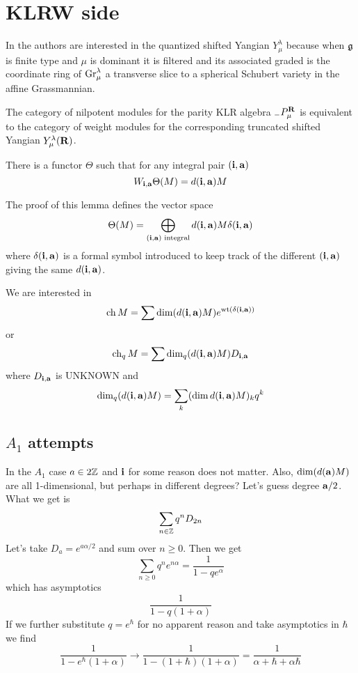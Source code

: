 
\section{KLRW side}


% 
In \cite{kam19} the authors are interested in the quantized shifted Yangian $Y^\lambda_\mu$ because when $\mathfrak g$ is finite type and $\mu$ is dominant it is filtered and its associated graded is the coordinate ring of $\operatorname{Gr}^\lambda_\mu$ a transverse slice to a spherical Schubert variety in the affine Grassmannian. 
%
\begin{theorem}\cite{kam19}
    The category of nilpotent modules for the parity KLR algebra ${}_-P_\mu^{{\bf R}}$ is equivalent to the category of weight modules for the corresponding truncated shifted Yangian $Y^\lambda_\mu({\bf R})$.
\end{theorem}
% 
\begin{lemma}\cite{kamnitzer2019category}
    There is a functor $\Theta$ such that for any integral pair $(\mathbf{i},\mathbf{a})$
    \[
    W_{\mathbf{i},\mathbf{a}}\Theta(M) = d(\mathbf{i},\mathbf{a}) M    
    \]
\end{lemma}
The proof of this lemma defines the vector space 
\[
\Theta(M) = \bigoplus_{(\mathbf{i},\mathbf{a})\text{ integral}} d(\mathbf{i},\mathbf{a}) M \delta(\mathbf{i},\mathbf{a})
\]
where $\delta(\mathbf{i},\mathbf{a})$ is a formal symbol introduced to keep track of the different $(\mathbf{i},\mathbf{a})$ giving the same $d(\mathbf{i},\mathbf{a})$. 

We are interested in 
\[
\operatorname{ch} M = \sum \dim (d(\mathbf{i},\mathbf{a}) M) e^{\operatorname{wt} (\delta(\mathbf{i},\mathbf{a}) )}    
\]
or 
\[
\operatorname{ch}_q M = \sum\dim_q (d(\mathbf{i},\mathbf{a}) M) D_{\mathbf{i},\mathbf{a}}   
\]
where $D_{\mathbf{i},\mathbf{a}}$ is UNKNOWN and 
$$\dim_q (d(\mathbf{i},\mathbf{a}) M) = \sum_k (\dim d(\mathbf{i},\mathbf{a}) M)_k q^k$$

\subsection{$A_1$ attempts}

In the $A_1$ case $a\in 2\mathbb Z$ and $\mathbf{i}$ for some reason does not matter. 
Also, $\dim (d(\mathbf{a}) M)$ are all 1-dimensional, but perhaps in different degrees? Let's guess degree $\mathbf{a}/2$. 
What we get is 
\[
    \sum_{n\in\mathbb Z} q^{n} D_{2n}
\]
Let's take $D_{a} = e^{a\alpha/2}$ and sum over $n\ge 0$. Then we get 
\[
    \sum_{n\ge 0} q^n e^{n\alpha} = \frac 1 {1 - qe^\alpha}
\]
which has asymptotics 
\[
\frac 1 {1 - q(1 + \alpha)}    
\]
If we further substitute $q = e^\hbar$ for no apparent reason and take asymptotics in $\hbar$ we find 
\[
    \frac 1 {1 - e^\hbar (1 + \alpha)}  \to \frac 1 {1 - (1 + \hbar) (1 + \alpha)} = \frac 1 {\alpha + \hbar + \alpha\hbar } 
\]


